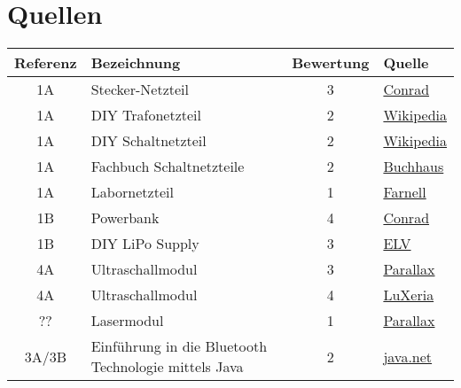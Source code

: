 \section{Quellen}

	\begin{longtable}{c l c l}
		\centering
		\textbf{Referenz} & \textbf{Bezeichnung} & \textbf{Bewertung} & \textbf{Quelle} \\
		\hline
        	1A 
			& Stecker-Netzteil 
			& 3 
			& \href{http://www.conrad.ch/ce/de/product/514218/Stecker-Netzteil-Festspannung-VOLTCRAFT-FPPS-9-36W-9-VDC-400-mA?ref=searchDetail}{Conrad} \\
        	1A 
			& DIY Trafonetzteil 
			& 2 
			& \href{http://de.wikipedia.org/wiki/Netzteil#Trafonetzteil}{Wikipedia} \\
        	1A 	
			& DIY Schaltnetzteil 
			& 2 
			& \href{http://de.wikipedia.org/wiki/Netzteil#Schaltnetzteil}{Wikipedia} \\
        	1A 	
			& Fachbuch Schaltnetzteile 
			& 2 
			& \href{http://www.buchhaus.ch/start/detail/ISBN-9783834816467/Schlienz-Ulrich/Schaltnetzteile-und-ihre-Peripherie}{Buchhaus} \\
        	1A 
			& Labornetzteil 
			& 1 
			& \href{http://ch.farnell.com/tenma/72-10480/labornetzteil-1fach-30v-3a/dp/2251946}{Farnell} \\
        	1B 
			& Powerbank 
			& 4 	
			& \href{http://www.conrad.ch/ce/de/product/776952/iGo-Powerbank-1-USB-4700-mAh-schwarz-LiPo-4700-mAh-PS00319-0002-Powerbank-1-USB-Mobile-Stromversorgung-Zusatzakku-En?ref=searchDetail}{Conrad} \\
        	1B 	
			& DIY LiPo Supply 
			& 3 
			& \href{http://www.elv.ch/li-ion-lipo-ladegeraet-lipo-4-komplettbausatz.html}{ELV} \\
        	4A 
			& Ultraschallmodul 
			& 3 
			& \href{http://www.parallax.com/product/28015}{Parallax} \\
        	4A 
			& Ultraschallmodul 
			& 4 
			& \href{https://github.com/luxeria/e-wall}{LuXeria} \\
        	?? 
			& Lasermodul 
			& 1 
			& \href{http://www.parallax.com/product/28044}{Parallax} \\ 
		3A/3B 
			& Einführung in die Bluetooth Technologie mittels Java 
			& 2 
			& \href{https://today.java.net/pub/a/today/2004/07/27/bluetooth.html}{java.net} \\

\end{longtable}
